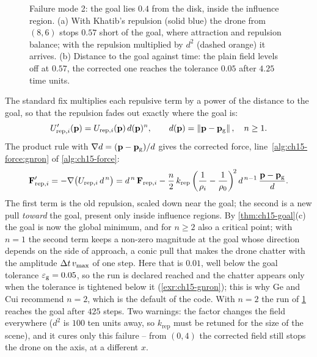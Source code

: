\begin{figure}[tb]
  \centering
  \caption{Failure mode 2: the goal lies $0.4$ from the disk, inside the
  influence region. (a) With Khatib's repulsion (solid blue) the drone from
  $(8, 6)$ stops $0.57$ short of the goal, where attraction and repulsion
  balance; with the repulsion multiplied by $d^2$ (dashed orange) it arrives.
  (b) Distance to the goal against time: the plain field levels off at
  $0.57$, the corrected one reaches the tolerance $0.05$ after $4.25$ time
  units.}
  \label{fig:ch15-gnron}
\end{figure}

The standard fix multiplies each repulsive term by a power of the distance
to the goal, so that the repulsion fades out exactly where the goal is:
\begin{equation}
  U'_{\mathrm{rep},i}(\mathbf{p}) = U_{\mathrm{rep},i}(\mathbf{p})\, d(\mathbf{p})^{n},
  \qquad d(\mathbf{p}) = \left\lVert \mathbf{p} - \mathbf{p}_{\mathrm{g}} \right\rVert,\quad n \ge 1.
  \label{eq:ch15-gnron-u}
\end{equation}
The product rule with $\nabla d = (\mathbf{p} - \mathbf{p}_{\mathrm{g}})/d$ gives the
corrected force, line~\ref{alg:ch15-force:gnron} of \cref{alg:ch15-force}:
\begin{equation}
  \mathbf{F}'_{\mathrm{rep},i}
  = -\nabla \bigl( U_{\mathrm{rep},i}\, d^{\,n} \bigr)
  = d^{\,n}\, \mathbf{F}_{\mathrm{rep},i}
    - \frac{n}{2}\, k_{\mathrm{rep}} \left( \frac{1}{\rho_i} - \frac{1}{\rho_0} \right)^{\!2} d^{\,n-1}\,
      \frac{\mathbf{p} - \mathbf{p}_{\mathrm{g}}}{d}.
  \label{eq:ch15-gnron-f}
\end{equation}
The first term is the old repulsion, scaled down near the goal; the second
is a new pull \emph{toward} the goal, present only inside influence
regions. By \cref{thm:ch15-goal}(c) the goal is now the global minimum, and
for $n \ge 2$ also a critical point; with $n = 1$ the second term keeps a
non-zero magnitude at the goal whose direction depends on the side of
approach, a conic pull that makes the drone chatter with the amplitude $\Delta t\, v_{\max}$
of one step. Here that is $0.01$, well below the goal tolerance
$\varepsilon_{\mathrm{g}} = 0.05$, so the run is declared reached and the chatter
appears only when the tolerance is tightened below it (\cref{exr:ch15-gnron});
this is why Ge and Cui recommend $n = 2$, which is the default of the code.
With $n = 2$ the run of \cref{fig:ch15-gnron} reaches the goal after $425$
steps. Two warnings: the factor changes the field everywhere ($d^2$ is $100$
ten units away, so $k_{\mathrm{rep}}$ must be retuned for the size of the
scene), and it cures only this failure -- from $(0, 4)$ the corrected field
still stops the drone on the axis, at a different $x$.

